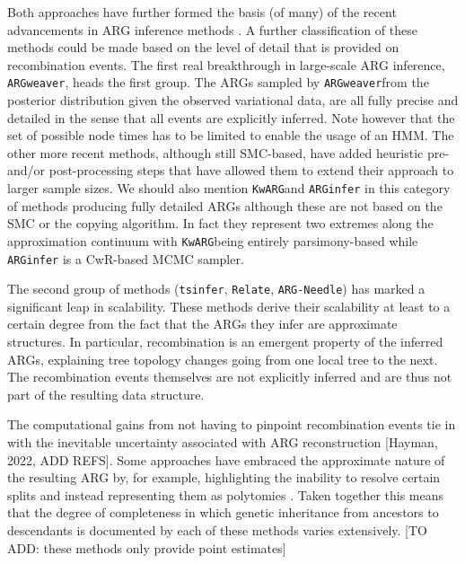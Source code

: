 \documentclass{article}
\newcommand{\tsinfer}[0]{\texttt{tsinfer}}
\newcommand{\kwarg}[0]{\texttt{KwARG}}
\newcommand{\argneedle}[0]{\texttt{ARG-Needle}}
\newcommand{\argweaver}[0]{\texttt{ARGweaver}}
\newcommand{\relate}[0]{\texttt{Relate}}
\begin{document}
Both approaches have further formed the basis (of many) of the recent advancements in
ARG inference methods \citep{rasmussen_genome-wide_2014, heine_bridging_2018,
kelleher_inferring_2019, speidel_method_2019, rasmussen_espalier_2022, zhang_biobank-scale_2023}.
A further classification of these methods could be made based on the level of detail
that is provided on recombination events. The first real breakthrough in large-scale
ARG inference, \argweaver, heads the first group.
The ARGs sampled by \argweaver from the posterior distribution
given the observed variational data, are all fully precise and detailed in the sense
that all events are explicitly inferred. Note however that the set of possible node times
has to be limited to enable the usage of an HMM. The other more recent methods, although
still SMC-based, have added heuristic pre- and/or post-processing steps
that have allowed them to extend their approach to larger sample sizes. We should also
mention \kwarg and \texttt{ARGinfer} in this category of methods producing fully detailed ARGs
although these are not based on the SMC or the copying algorithm. In fact they represent
two extremes along the approximation continuum with \kwarg being entirely
parsimony-based while \texttt{ARGinfer} is a CwR-based MCMC sampler.



The second group of methods (\tsinfer, \relate, \argneedle) has marked a significant
leap in scalability. These methods derive their scalability at least to a certain
degree from the fact that the ARGs they infer are approximate structures. In particular,
recombination is an emergent property of the inferred ARGs, explaining tree topology
changes going from one local tree to the next. The recombination events themselves
are not explicitly inferred and are thus not part of the resulting data structure.

The computational gains from not having to pinpoint recombination events tie in
with the inevitable uncertainty associated with ARG reconstruction [Hayman, 2022, ADD REFS].
Some approaches have embraced the approximate nature of the resulting ARG by, for
example, highlighting the inability to resolve certain splits and instead representing
them as polytomies \citep{kelleher_inferring_2019}. Taken together this means that the
degree of completeness in which genetic inheritance from ancestors to descendants is documented
by each of these methods varies extensively.
[TO ADD: these methods only provide point estimates]
\end{document}
